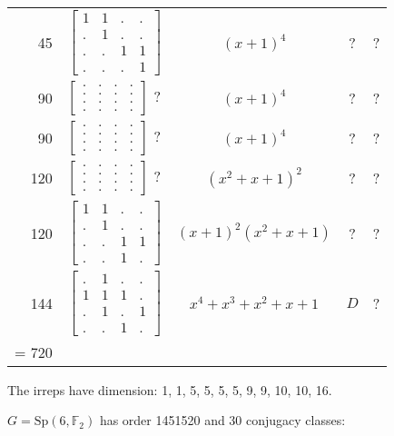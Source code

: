 \documentclass[11pt,oneside]{article}
\newcommand{\Sp}{\mathrm{Sp}}
\newcommand{\Field}{\mathbb{F}}
\begin{document}
\begin{center}
\begin{tabular}{r|l|c|c|c}
45  & $\begin{bmatrix}1&1&.&.\\.&1&.&.\\.&.&1&1\\.&.&.&1\end{bmatrix}$  & $(x+1)^4$  & ? & ?  \\
90  &  $\begin{bmatrix}.&.&.&.\\.&.&.&.\\.&.&.&.\\.&.&.&.\end{bmatrix}$ ?  & $(x+1)^4$  & ? & ?  \\
90  & $\begin{bmatrix}.&.&.&.\\.&.&.&.\\.&.&.&.\\.&.&.&.\end{bmatrix}$  ?  & $(x+1)^4$  & ? & ?  \\
120  & $\begin{bmatrix}.&.&.&.\\.&.&.&.\\.&.&.&.\\.&.&.&.\end{bmatrix}$ ?   & $(x^2+x+1)^2$  & ? & ?  \\
120  & $\begin{bmatrix}1&1&.&.\\.&1&.&.\\.&.&1&1\\.&.&1&.\end{bmatrix}$     & $(x+1)^2(x^2+x+1)$  & ? & ?  \\
144  & $\begin{bmatrix}.&1&.&.\\1&1&1&.\\.&1&.&1\\.&.&1&.\end{bmatrix}$    & $x^4+x^3+x^2+x+1$  & $D$ & ?  \\
\hline
\strut = 720 \\
\end{tabular}
\end{center}
The irreps have dimension: 1, 1, 5, 5, 5, 5, 9, 9, 10, 10, 16.

$G = \Sp(6,\Field_2)$  has order 1451520 and 30 conjugacy classes:
\end{document}
